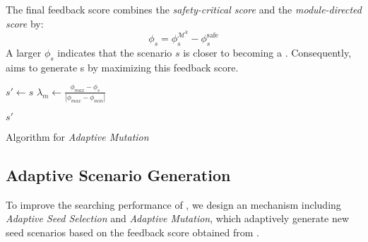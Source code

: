 The final feedback score combines the \textit{safety-critical score} and the \textit{module-directed score} by:
\begin{equation}\label{eq:feedback}
    \phi_{s} =  \phi_{s}^{\mathcal{M}^k} - \phi_{s}^{\text{safe}}
\end{equation}
A larger \(\phi_{s}\) indicates that the scenario \( s \) is closer to becoming a {\mccs}. Consequently, \tool aims to generate {\mccs}s by maximizing this feedback score.



\begin{algorithm}[!t]
\small
{}
$s' \gets s$ 
$\lambda_{m} \gets \frac{{\phi}_{max} - {\phi}_{s}}{|{\phi}_{max} - {\phi}_{min}|}$ 

\Return $s'$
\caption{Algorithm for \textit{Adaptive Mutation}}
\label{algo:mutation}
\end{algorithm}
\subsection{Adaptive Scenario Generation} %
To improve the searching performance of \tool, we design an \select mechanism including \textit{Adaptive Seed Selection} and \textit{Adaptive Mutation}, which adaptively generate new seed scenarios based on the feedback score obtained from \feedback.


